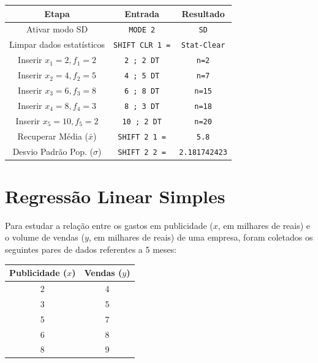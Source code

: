 \begin{table}[H]
    \centering
    \begin{tabular}{|c|c|c|}
        \hline
        \textbf{Etapa} & \textbf{Entrada} & \textbf{Resultado} \\ \hline
        Ativar modo SD & \texttt{MODE 2} & \texttt{SD} \\
        Limpar dados estatísticos & \texttt{SHIFT CLR 1 =} & \texttt{Stat-Clear} \\
        Inserir $x_1=2, f_1=2$ & \texttt{2 ; 2 DT} & \texttt{n=2} \\
        Inserir $x_2=4, f_2=5$ & \texttt{4 ; 5 DT} & \texttt{n=7} \\
        Inserir $x_3=6, f_3=8$ & \texttt{6 ; 8 DT} & \texttt{n=15} \\
        Inserir $x_4=8, f_4=3$ & \texttt{8 ; 3 DT} & \texttt{n=18} \\
        Inserir $x_5=10, f_5=2$ & \texttt{10 ; 2 DT} & \texttt{n=20} \\
        Recuperar Média ($\bar{x}$) & \texttt{SHIFT 2 1 =} & \texttt{5.8} \\
        Desvio Padrão Pop. ($\sigma$) & \texttt{SHIFT 2 2 =} & \texttt{2.181742423} \\ \hline
    \end{tabular}
\end{table}

\section{Regressão Linear Simples}

Para estudar a relação entre os gastos em publicidade ($x$, em milhares de reais) e o volume de vendas ($y$, em milhares de reais) de uma empresa, foram coletados os seguintes pares de dados referentes a 5 meses:

\begin{table}[H]
    \centering
    \begin{tabular}{|c|c|}
        \hline
        \textbf{Publicidade ($x$)} & \textbf{Vendas ($y$)} \\ \hline
        2 & 4 \\
        3 & 5 \\
        5 & 7 \\
        6 & 8 \\
        8 & 9 \\ \hline
    \end{tabular}
    \label{tab:regressao_exemplo}
\end{table}

